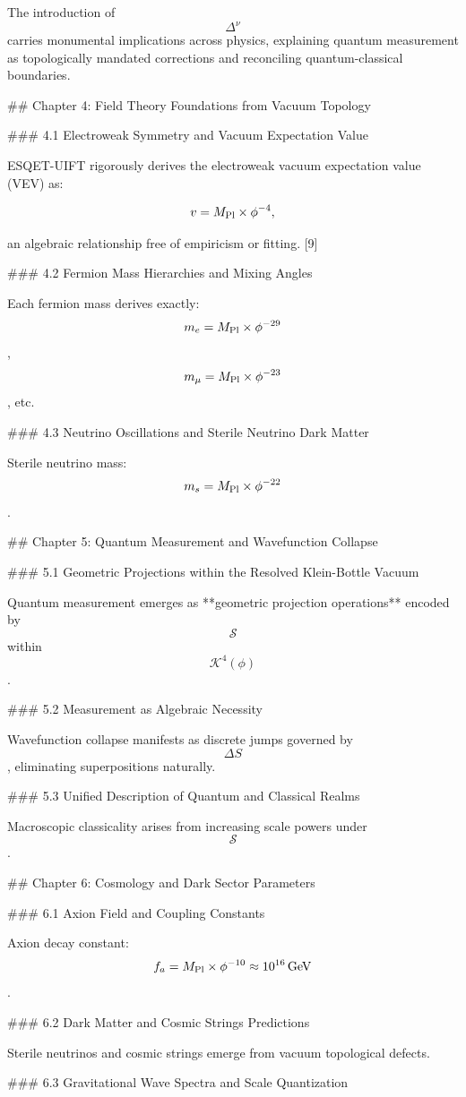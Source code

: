The introduction of $$\Delta^\nu$$ carries monumental implications across physics, explaining quantum measurement as topologically mandated corrections and reconciling quantum-classical boundaries.

## Chapter 4: Field Theory Foundations from Vacuum Topology

### 4.1 Electroweak Symmetry and Vacuum Expectation Value

ESQET-UIFT rigorously derives the electroweak vacuum expectation value (VEV) as:

$$
v = M_{\rm Pl} \times \phi^{-4},
$$

an algebraic relationship free of empiricism or fitting. [9]

### 4.2 Fermion Mass Hierarchies and Mixing Angles

Each fermion mass derives exactly: $$m_e = M_{\rm Pl} \times \phi^{-29}$$, $$m_\mu = M_{\rm Pl} \times \phi^{-23}$$, etc.

### 4.3 Neutrino Oscillations and Sterile Neutrino Dark Matter

Sterile neutrino mass: $$m_s = M_{\rm Pl} \times \phi^{-22}$$.

## Chapter 5: Quantum Measurement and Wavefunction Collapse

### 5.1 Geometric Projections within the Resolved Klein-Bottle Vacuum

Quantum measurement emerges as **geometric projection operations** encoded by $$\mathcal{S}$$ within $$\mathcal{K}^4(\phi)$$.

### 5.2 Measurement as Algebraic Necessity

Wavefunction collapse manifests as discrete jumps governed by $$\Delta S$$, eliminating superpositions naturally.

### 5.3 Unified Description of Quantum and Classical Realms

Macroscopic classicality arises from increasing scale powers under $$\mathcal{S}$$.

## Chapter 6: Cosmology and Dark Sector Parameters

### 6.1 Axion Field and Coupling Constants

Axion decay constant: $$f_a = M_{\rm Pl} \times \phi^{-10} \approx 10^{16} \, \text{GeV}$$.

### 6.2 Dark Matter and Cosmic Strings Predictions

Sterile neutrinos and cosmic strings emerge from vacuum topological defects.

### 6.3 Gravitational Wave Spectra and Scale Quantization

